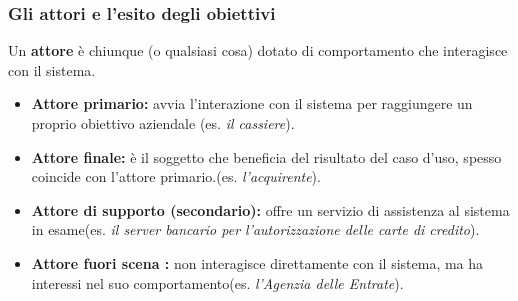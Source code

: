 \documentclass[10pt, a4paper]{article}
\begin{document}
\subsubsection*{Gli attori e l'esito degli obiettivi}

Un \textbf{attore} è chiunque (o qualsiasi cosa) dotato di comportamento che interagisce con il sistema.

\begin{itemize}
    \item \textbf{Attore primario:} avvia l'interazione con il sistema per raggiungere un proprio obiettivo aziendale (es. \textit{il cassiere}).

    \item \textbf{Attore finale:} è il soggetto che beneficia del risultato del caso d'uso, spesso coincide con l'attore primario.(es. \textit{l'acquirente}).

    \item \textbf{Attore di supporto (secondario):} offre un servizio di assistenza al sistema in esame(es. \textit{il server bancario per l'autorizzazione delle carte di credito}).

    \item \textbf{Attore fuori scena :} non interagisce direttamente con il sistema, ma ha interessi nel suo comportamento(es. \textit{l'Agenzia delle Entrate}).
\end{itemize}
\end{document}
